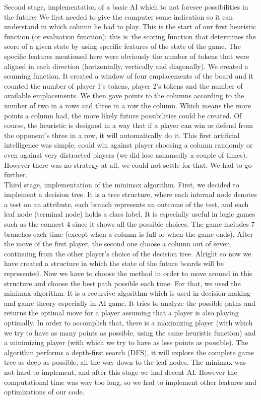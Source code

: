 \documentclass[12pt, a4paper, oneside]{report}
\begin{document}
Second stage, implementation of a basic AI which to not foresee possibilities in the future:
	We first needed to give the computer some indication so it can understand in which column he had to play. This is the start of our first heuristic function (or evaluation function): this is the scoring function that determines the score of a given state by using specific features of the state of the game. The specific features mentioned here were obviously the number of tokens that were aligned in each direction (horizontally, vertically and diagonally). We created a scanning function. It created a window of four emplacements of the board and it counted the number of player 1’s tokens, player 2’s tokens and the number of available emplacements. We then gave points to the columns according to the number of two in a rows and three in a row the column. Which means the more points a column had, the more likely future possibilities could be created. Of course, the heuristic is designed in a way that if a player can win or defend from the opponent’s three in a row, it will automatically do it.
	This first artificial intelligence was simple, could win against player choosing a column randomly or even against very distracted players (we did lose ashamedly a couple of times). However there was no strategy at all, we could not settle for that. We had to go further. \\

Third stage, implementation of the minimax algorithm.
	First, we decided to implement a decision tree. It is a tree structure, where each internal node denotes a test on an attribute, each branch represents an outcome of the test, and each leaf node (terminal node) holds a class label. It is especially useful in logic games such as the connect 4 since it shows all the possible choices. The game includes 7 branches each time (except when a column is full or when the game ends). After the move of the first player, the second one choose a column out of seven, continuing from the other player’s choice of the decision tree.
	Alright so now we have created a structure in which the state of the future boards will be represented. Now we have to choose the method in order to move around in this structure and choose the best path possible each time. For that, we used the minimax algorithm. It is a recursive algorithm which is used in decision-making and game theory especially in AI game. It tries to analyze the possible paths and returns the optimal move for a player assuming that a player is also playing optimally. In order to accomplish that, there is a maximizing player (with which we try to have as many points as possible, using the same heuristic function) and a minimizing player (with which we try to have as less points as possible). The algorithm performs a depth-first search (DFS), it will explore the complete game tree as deep as possible, all the way down to the leaf nodes.
The minimax was not hard to implement, and after this stage we had  decent AI. However the computational time was way too long, so we had to implement other features and optimizations of our code. \\
\end{document}

